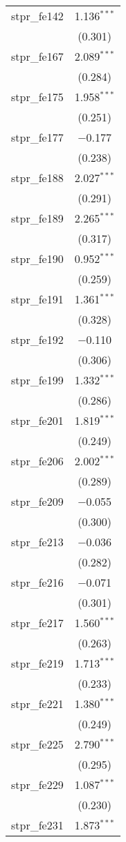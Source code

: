 \begin{table}[!htbp]
\begin{tabular}{@{\extracolsep{5pt}}lc}
  stpr\_fe142 & 1.136$^{***}$ \\ 
  & (0.301) \\ 
  stpr\_fe167 & 2.089$^{***}$ \\ 
  & (0.284) \\ 
  stpr\_fe175 & 1.958$^{***}$ \\ 
  & (0.251) \\ 
  stpr\_fe177 & $-$0.177 \\ 
  & (0.238) \\ 
  stpr\_fe188 & 2.027$^{***}$ \\ 
  & (0.291) \\ 
  stpr\_fe189 & 2.265$^{***}$ \\ 
  & (0.317) \\ 
  stpr\_fe190 & 0.952$^{***}$ \\ 
  & (0.259) \\ 
  stpr\_fe191 & 1.361$^{***}$ \\ 
  & (0.328) \\ 
  stpr\_fe192 & $-$0.110 \\ 
  & (0.306) \\ 
  stpr\_fe199 & 1.332$^{***}$ \\ 
  & (0.286) \\ 
  stpr\_fe201 & 1.819$^{***}$ \\ 
  & (0.249) \\ 
  stpr\_fe206 & 2.002$^{***}$ \\ 
  & (0.289) \\ 
  stpr\_fe209 & $-$0.055 \\ 
  & (0.300) \\ 
  stpr\_fe213 & $-$0.036 \\ 
  & (0.282) \\ 
  stpr\_fe216 & $-$0.071 \\ 
  & (0.301) \\ 
  stpr\_fe217 & 1.560$^{***}$ \\ 
  & (0.263) \\ 
  stpr\_fe219 & 1.713$^{***}$ \\ 
  & (0.233) \\ 
  stpr\_fe221 & 1.380$^{***}$ \\ 
  & (0.249) \\ 
  stpr\_fe225 & 2.790$^{***}$ \\ 
  & (0.295) \\ 
  stpr\_fe229 & 1.087$^{***}$ \\ 
  & (0.230) \\ 
  stpr\_fe231 & 1.873$^{***}$ \\ 

\end{tabular}
\end{table}
